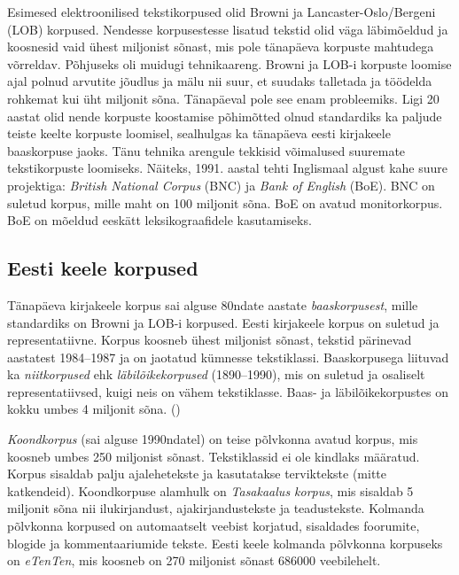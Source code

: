 \documentclass[12pt]{article}
\begin{document}
Esimesed elektroonilised tekstikorpused olid Browni ja Lancaster-Oslo/Bergeni (LOB) korpused. Nendesse korpusestesse lisatud tekstid olid väga läbimõeldud ja koosnesid vaid ühest miljonist sõnast, mis pole tänapäeva korpuste mahtudega võrreldav. Põhjuseks oli muidugi tehnikaareng. Browni ja LOB-i korpuste loomise ajal polnud arvutite jõudlus ja mälu nii suur, et suudaks talletada ja töödelda rohkemat kui üht miljonit sõna.
Tänapäeval pole see enam probleemiks. Ligi 20 aastat olid nende korpuste koostamise põhimõtted olnud standardiks ka paljude teiste keelte korpuste loomisel, sealhulgas ka tänapäeva eesti kirjakeele baaskorpuse jaoks. Tänu tehnika arengule tekkisid võimalused
suuremate tekstikorpuste loomiseks. Näiteks, 1991. aastal tehti Inglismaal algust kahe suure projektiga: \emph{British National Corpus} (BNC) ja \emph{Bank of English} (BoE). BNC on suletud korpus, mille maht on 100 miljonit sõna. BoE on avatud monitorkorpus. BoE on mõeldud eeskätt leksikograafidele kasutamiseks.
 \citep[9--11]{KR}


\subsection{Eesti keele korpused}

Tänapäeva kirjakeele korpus sai alguse 80ndate aastate \emph{baaskorpusest}, mille standardiks on Browni ja LOB-i korpused. Eesti kirjakeele korpus on suletud ja representatiivne. Korpus koosneb ühest miljonist sõnast, tekstid pärinevad aastatest 1984--1987 ja on jaotatud kümnesse tekstiklassi. Baaskorpusega liituvad ka \emph{niitkorpused} ehk \emph{läbilõikekorpused} (1890--1990), mis on suletud ja osaliselt representatiivsed, kuigi neis on vähem tekstiklasse. Baas- ja läbilõikekorpustes on kokku umbes 4 miljonit sõna. (\citealp[14--15]{KR})

\emph{Koondkorpus} (sai alguse 1990ndatel) on teise põlvkonna avatud korpus, mis koosneb umbes 250 miljonist sõnast. Tekstiklassid ei ole kindlaks määratud. Korpus sisaldab palju ajalehetekste ja kasutatakse terviktekste (mitte katkendeid). Koondkorpuse alamhulk on \emph{Tasakaalus korpus}, mis sisaldab 5 miljonit sõna nii ilukirjandust, ajakirjandustekste ja teadustekste. Kolmanda põlvkonna korpused on automaatselt veebist korjatud, sisaldades foorumite, blogide ja kommentaariumide tekste. \citep[38]{M_OK2015} Eesti keele kolmanda põlvkonna korpuseks on \emph{eTenTen}, mis koosneb on 270 miljonist sõnast 686000 veebilehelt. \citep{eTenTen}
\end{document}
